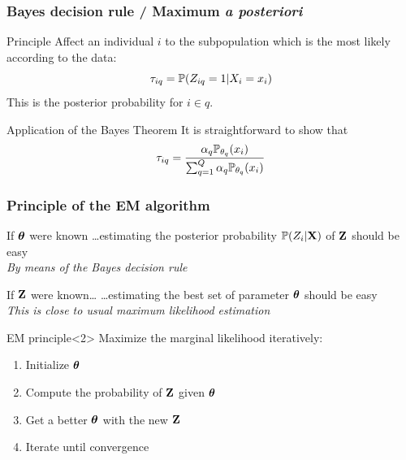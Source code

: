 \documentclass{beamer}\usepackage[]{graphicx}\usepackage[]{color}
\begin{document}
\begin{frame}
  \frametitle{Bayes decision rule / Maximum \textit{a posteriori}}

  \begin{block}{Principle}
    Affect an individual $i$ to the subpopulation which is the most likely according to the data:
    \begin{equation*}
      \tau_{iq} = \mathbb{P}(Z_{iq}=1 | X_i = x_i)
    \end{equation*}
    This is the \alert{posterior probability} for $i\in q$.
  \end{block}

  \vfill

  \begin{block}{Application of the Bayes Theorem}
    It is straightforward to show that
    \begin{equation*}
      \tau_{iq} = \frac{\alpha_q \mathbb{P}_{\theta_q}(x_i)}{\sum_{q=1}^Q \alpha_q \mathbb{P}_{\theta_q}(x_i)}
    \end{equation*}
  \end{block}

\end{frame}

\begin{frame}
  \frametitle{Principle of the EM algorithm}

  \begin{block}{If $\boldsymbol\theta$ were known}
    \dots estimating the \alert{posterior probability $\mathbb{P}(Z_i|\mathbf{X})$} of $\mathbf{Z}$ should be easy\\
    \textit{By means of the Bayes decision rule}
  \end{block}

  \vfill

  \begin{block}{If $\mathbf{Z}$ were known\dots}
    \dots estimating the \alert{best set of parameter} $\boldsymbol\theta$ should be easy\\
    \textit{This is close to usual maximum likelihood estimation}
  \end{block}

  \vfill

  \begin{block}{EM principle}<2>
    Maximize the marginal likelihood iteratively:
    \begin{enumerate}
      \item Initialize $\boldsymbol\theta$
      \item Compute the probability of $\mathbf{Z}$ given $\boldsymbol\theta$
      \item Get a better $\boldsymbol\theta$ with the new $\mathbf{Z}$
      \item Iterate until convergence
    \end{enumerate}
  \end{block}


\end{frame}
\end{document}
